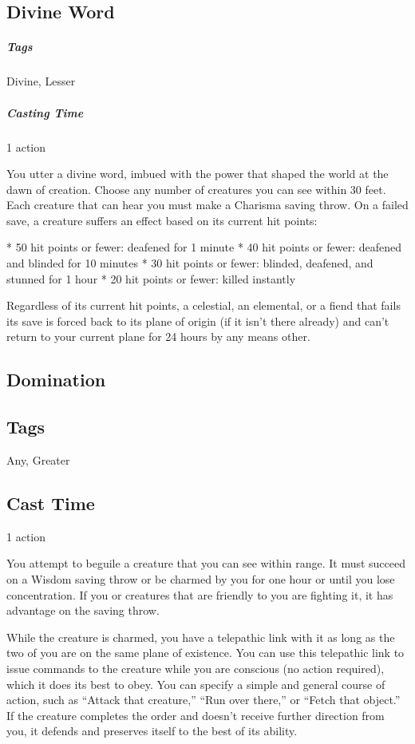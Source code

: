 \subsection{Divine Word}
\subparagraph*{Tags} Divine, Lesser
\subparagraph*{Casting Time} 1 action

You utter a divine word, imbued with the power that shaped the world at the dawn of creation. Choose any number of creatures you can see within 30 feet. Each creature that can hear you must make a Charisma saving throw. On a failed save, a creature suffers an effect based on its current hit points:

* 50 hit points or fewer: deafened for 1 minute
* 40 hit points or fewer: deafened and blinded for 10 minutes
* 30 hit points or fewer: blinded, deafened, and stunned for 1 hour
* 20 hit points or fewer: killed instantly 

Regardless of its current hit points, a celestial, an elemental, or a fiend that fails its save is forced back to its plane of origin (if it isn’t there already) and can’t return to your current plane for 24 hours by any means other.

\subsection{Domination}
\subsection*{Tags} Any, Greater
\subsection*{Cast Time} 1 action

You attempt to beguile a creature that you can see within range. It must succeed on a Wisdom saving throw or be charmed by you for one hour or until you lose concentration. If you or creatures that are friendly to you are fighting it, it has advantage on the saving throw.

While the creature is charmed, you have a telepathic link with it as long as the two of you are on the same plane of existence. You can use this telepathic link to issue commands to the creature while you are conscious (no action required), which it does its best to obey. You can specify a simple and general course of action, such as “Attack that creature,” “Run over there,” or “Fetch that object.” If the creature completes the order and doesn’t receive further direction from you, it defends and preserves itself to the best of its ability.

